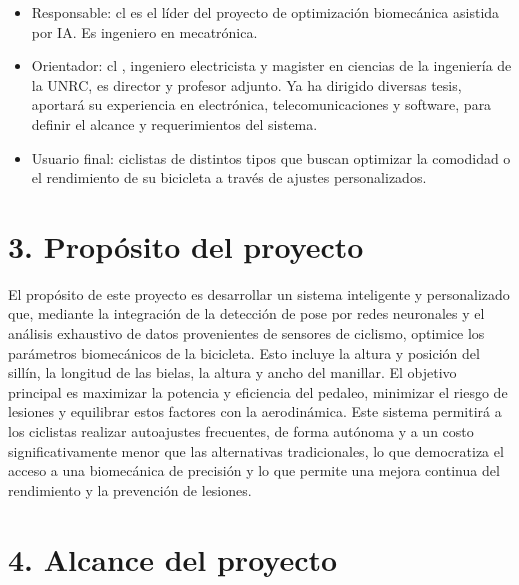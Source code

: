 \documentclass[
11pt, %
]{charter}
\begin{document}
\begin{itemize}

\item Responsable: cl \authorname es el líder del proyecto de optimización biomecánica asistida por IA. Es ingeniero en mecatrónica.

\item Orientador: cl \supname	, ingeniero electricista y magister en ciencias de la ingeniería de la UNRC, es director y profesor adjunto. Ya ha dirigido diversas tesis, aportará su experiencia en electrónica, telecomunicaciones y software, para definir el alcance y requerimientos del sistema.
\item Usuario final: ciclistas de distintos tipos que buscan optimizar la comodidad o el rendimiento de su bicicleta a través de ajustes personalizados.
\end{itemize}



\section{3. Propósito del proyecto}
\label{sec:proposito}
El propósito de este proyecto es desarrollar un sistema inteligente y personalizado que, mediante la integración de la detección de pose por redes neuronales y el análisis exhaustivo de datos provenientes de sensores de ciclismo, optimice los parámetros biomecánicos de la bicicleta. Esto incluye la altura y posición del sillín, la longitud de las bielas, la altura y ancho del manillar. El objetivo principal es maximizar la potencia y eficiencia del pedaleo, minimizar el riesgo de lesiones y equilibrar estos factores con la aerodinámica.
Este sistema permitirá a los ciclistas realizar autoajustes frecuentes, de forma autónoma y a un costo significativamente menor que las alternativas tradicionales, lo que democratiza el acceso a una biomecánica de precisión y lo que permite una mejora continua del rendimiento y la prevención de lesiones.

\section{4. Alcance del proyecto}
\label{sec:alcance}
\end{document}

